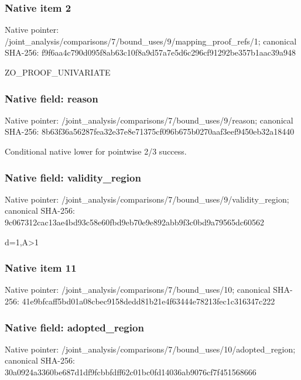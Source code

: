 \documentclass[10pt,a4paper]{article}
\begin{document}
\subsubsection{Native item 2}
Native pointer: /joint\_\allowbreak{}analysis/comparisons/7/bound\_\allowbreak{}uses/9/mapping\_\allowbreak{}proof\_\allowbreak{}refs/1; canonical SHA-256: f9f6aa4c790d095f8ab63c10f8a9d57a7e5d6c296cf91292be357b1aac39a948

\begingroup\raggedright\sloppy ZO\_\allowbreak{}PROOF\_\allowbreak{}UNIVARIATE\par\endgroup

\subsubsection{Native field: reason}
Native pointer: /joint\_\allowbreak{}analysis/comparisons/7/bound\_\allowbreak{}uses/9/reason; canonical SHA-256: 8b63f36a56287fea32e37e8e71375cf096b675b0270aaf3eef9450eb32a18440

\begingroup\raggedright\sloppy Conditional native lower for pointwise 2/\allowbreak{}3 success.\par\endgroup

\subsubsection{Native field: validity\_\allowbreak{}region}
Native pointer: /joint\_\allowbreak{}analysis/comparisons/7/bound\_\allowbreak{}uses/9/validity\_\allowbreak{}region; canonical SHA-256: 9c067312cac13ae4bd93c58e60fbd9eb70e9e892abb9f3c0bd9a79565dc60562

\begingroup\raggedright\sloppy d=\allowbreak{}1,\allowbreak{}A>1\par\endgroup

\subsubsection{Native item 11}
Native pointer: /joint\_\allowbreak{}analysis/comparisons/7/bound\_\allowbreak{}uses/10; canonical SHA-256: 41e9bfcaff5bd01a08cbec9158dedd81b21e4f63444e78213fec1c316347c222

\subsubsection{Native field: adopted\_\allowbreak{}region}
Native pointer: /joint\_\allowbreak{}analysis/comparisons/7/bound\_\allowbreak{}uses/10/adopted\_\allowbreak{}region; canonical SHA-256: 30a0924a3360be687d1df9fcbbfdff62c01bc0fd14036ab9076cf7f451568666
\end{document}
